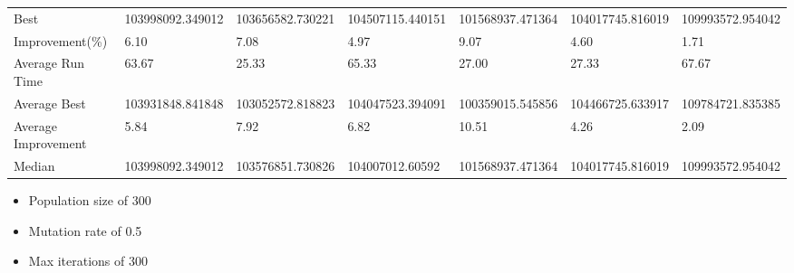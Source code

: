 \begin{table}[H]
{\begin{tabular}{lllllll}
\cellcolor[HTML]{ECF4FF}Best                & 103998092.349012 & 103656582.730221 & 104507115.440151 & 101568937.471364 & 104017745.816019 & 109993572.954042 \\
\cellcolor[HTML]{ECF4FF}Improvement(\%)     & 6.10             & 7.08             & 4.97             & 9.07             & 4.60             & 1.71             \\
\rowcolor[HTML]{CBCEFB} 
\cellcolor[HTML]{DAE8FC}Average Run Time    & 63.67            & 25.33            & 65.33            & 27.00            & 27.33            & 67.67            \\
\rowcolor[HTML]{CBCEFB} 
\cellcolor[HTML]{DAE8FC}Average Best        & 103931848.841848 & 103052572.818823 & 104047523.394091 & 100359015.545856 & 104466725.633917 & 109784721.835385 \\
\rowcolor[HTML]{CBCEFB} 
\cellcolor[HTML]{DAE8FC}Average Improvement & 5.84             & 7.92             & 6.82             & 10.51            & 4.26             & 2.09             \\
\rowcolor[HTML]{CBCEFB} 
\cellcolor[HTML]{DAE8FC}Median              & 103998092.349012 & 103576851.730826 & 104007012.60592  & 101568937.471364 & 104017745.816019 & 109993572.954042
\end{tabular}%
}
\end{table}

\begin{itemize}
  \item Population size of 300
  \item Mutation rate of 0.5
  \item Max iterations of 300
\end{itemize}

